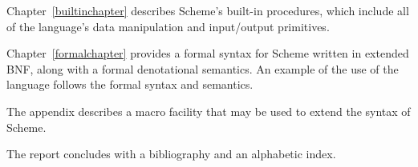 \vest Chapter~\ref{builtinchapter} describes Scheme's built-in
procedures, which include all of the language's data manipulation and
input/output primitives.

\vest Chapter~\ref{formalchapter} provides a formal syntax for Scheme
written in extended BNF, along with a formal denotational semantics.
An example of the use of the language follows the formal syntax and
semantics.

\vest The appendix describes a macro facility that may be used to
extend the syntax of Scheme.

\vest The report concludes with a bibliography and an
alphabetic index.



\vfill
\eject

{\footnotesize
\tableofcontents
}

\vfill
\eject
